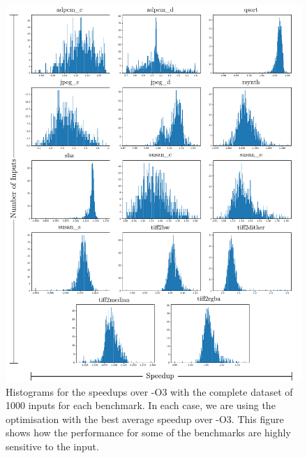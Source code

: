 \begin{figure}[h!]
    \centering
    \includegraphics[width=\textwidth]{figs/speedups-per-input.pdf}
    \caption{Histograms for the speedups over {\flagstype -O3} with the complete dataset of 1000 inputs for each benchmark.
             In each case, we are using the optimisation with the best average speedup over {\flagstype -O3}.
             This figure shows how the performance for some of the benchmarks are highly sensitive to the input.}
    \label{fig:speedups-per-input}
\end{figure}



